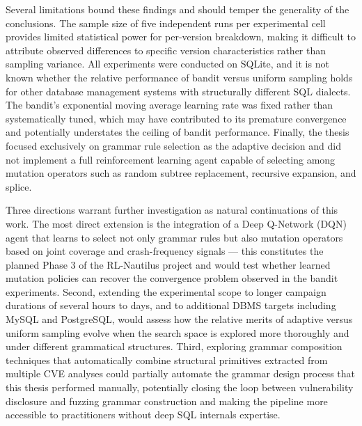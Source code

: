 Several limitations bound these findings and should temper the generality of the conclusions. The sample size of five independent runs per experimental cell provides limited statistical power for per-version breakdown, making it difficult to attribute observed differences to specific version characteristics rather than sampling variance. All experiments were conducted on SQLite, and it is not known whether the relative performance of bandit versus uniform sampling holds for other database management systems with structurally different SQL dialects. The bandit's exponential moving average learning rate was fixed rather than systematically tuned, which may have contributed to its premature convergence and potentially understates the ceiling of bandit performance. Finally, the thesis focused exclusively on grammar rule selection as the adaptive decision and did not implement a full reinforcement learning agent capable of selecting among mutation operators such as random subtree replacement, recursive expansion, and splice.

Three directions warrant further investigation as natural continuations of this work. The most direct extension is the integration of a Deep Q-Network (DQN) agent that learns to select not only grammar rules but also mutation operators based on joint coverage and crash-frequency signals --- this constitutes the planned Phase 3 of the RL-Nautilus project and would test whether learned mutation policies can recover the convergence problem observed in the bandit experiments. Second, extending the experimental scope to longer campaign durations of several hours to days, and to additional DBMS targets including MySQL and PostgreSQL, would assess how the relative merits of adaptive versus uniform sampling evolve when the search space is explored more thoroughly and under different grammatical structures. Third, exploring grammar composition techniques that automatically combine structural primitives extracted from multiple CVE analyses could partially automate the grammar design process that this thesis performed manually, potentially closing the loop between vulnerability disclosure and fuzzing grammar construction and making the pipeline more accessible to practitioners without deep SQL internals expertise.
